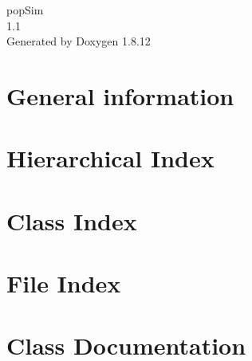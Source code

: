 \documentclass[twoside]{book}
\newcommand{\+}{\discretionary{\mbox{\scriptsize$\hookleftarrow$}}{}{}}
\newcommand{\clearemptydoublepage}{%
  \newpage{\pagestyle{empty}\cleardoublepage}%
}
\begin{document}
\hypersetup{pageanchor=false,
             bookmarksnumbered=true,
             pdfencoding=unicode
            }
\begin{titlepage}
\vspace*{7cm}
\begin{center}%
{\Large pop\+Sim \\[1ex]\large 1.\+1 }\\
\vspace*{1cm}
{\large Generated by Doxygen 1.8.12}\\
\end{center}
\end{titlepage}
\clearemptydoublepage
{}
\tableofcontents
\clearemptydoublepage
{}
\hypersetup{pageanchor=true}

\chapter{General information}
\label{index}\hypertarget{index}{}
\chapter{Hierarchical Index}

\chapter{Class Index}

\chapter{File Index}

\chapter{Class Documentation}































\end{document}
